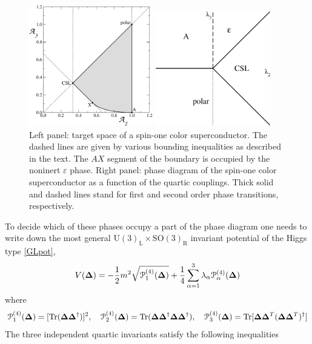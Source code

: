 \documentclass[final,2p,times,12pt,sort&compress]{elsarticle}
\newcommand\gr[1]{\mathrm{#1}}              %
\newcommand\PP{\EuScript{P}}                %
\newcommand\he[1]{#1^{\dagger}}             %
\newcommand\ve{\varepsilon}
\newcommand\op{\mathbf\Delta}               %
\DeclareMathOperator{\Tr}{Tr}
\begin{document}
\begin{figure}
\parbox{0.5\textwidth}{\includegraphics[width=0.48\textwidth]{fig_kim}}\hfill
\parbox{0.45\textwidth}{\includegraphics[width=0.45\textwidth]{fig_spin1CSC}}
\caption{Left panel: target space of a spin-one color superconductor. The
dashed lines are given by various bounding inequalities as described in the
text. The $AX$ segment of the boundary is occupied by the noninert $\ve$ phase.
Right panel: phase diagram of the spin-one color superconductor as a function
of the quartic couplings. Thick solid and dashed lines stand for first and
second order phase transitions, respectively.}
\label{fig:spin1PD}
\end{figure}
To decide which of these phases occupy a part of the phase diagram one needs to
write down the most general $\gr{U(3)_L\times SO(3)_R}$ invariant potential of
the Higgs type \eqref{GLpot},
\begin{equation}
V(\op)=-\frac12m^2\sqrt{\PP^{(4)}_1(\op)}+\frac14\sum_{\alpha=1}^3
\lambda_\alpha\PP^{(4)}_\alpha(\op)
\end{equation}
where
\begin{equation}
\PP^{(4)}_1(\op)=[\Tr(\op\he\op)]^2,\quad
\PP^{(4)}_2(\op)=\Tr(\op\he\op\op\he\op),\quad
\PP^{(4)}_3(\op)=\Tr[\op\op^T\he{(\op\op^T)}]
\end{equation}
The three independent quartic invariants satisfy the following inequalities
\end{document}
